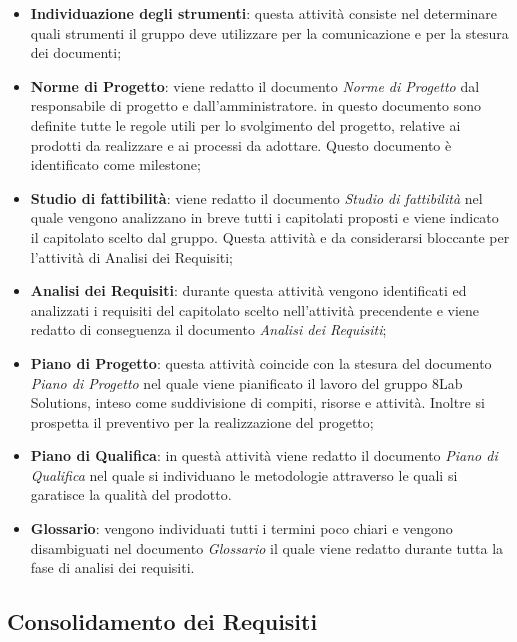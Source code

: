 \begin{itemize}
	\item \textbf{Individuazione degli strumenti}: questa attività consiste nel 
	determinare quali strumenti il gruppo deve utilizzare per la comunicazione 
	e per la stesura dei documenti; 
	\item \textbf{Norme di Progetto}: viene redatto il documento \textit{Norme 
	di Progetto} dal responsabile di progetto e dall'amministratore. in questo 
	documento sono definite tutte le regole utili per lo svolgimento del 
	progetto, relative ai prodotti da realizzare e ai processi da adottare. 
	Questo documento è identificato come milestone\glo; %
	\item \textbf{Studio di fattibilità}: viene redatto il documento 
	\textit{Studio di fattibilità} nel quale vengono analizzano in breve tutti 
	i capitolati proposti e viene indicato il capitolato scelto dal gruppo. 
	Questa attività e da considerarsi bloccante per l'attività di Analisi dei 
	Requisiti;
	\item \textbf{Analisi dei Requisiti}: durante questa attività vengono 
	identificati ed analizzati i requisiti del capitolato scelto nell'attività 
	precendente e viene redatto di conseguenza il documento \textit{Analisi dei 
	Requisiti};
	\item \textbf{Piano di Progetto}: questa attività coincide con la stesura 
	del documento \textit{Piano di Progetto} nel quale viene pianificato il 
	lavoro del gruppo 8Lab Solutions, inteso come suddivisione di compiti, 
	risorse e attività. Inoltre si prospetta il preventivo per la realizzazione 
	del progetto;
	\item \textbf{Piano di Qualifica}: in questà attività viene redatto il 
	documento \textit{Piano di Qualifica} nel quale si individuano le 
	metodologie attraverso le quali si garatisce la qualità del prodotto.
	\item \textbf{Glossario}: vengono individuati tutti i termini poco chiari e 
	vengono disambiguati nel documento \textit{Glossario} il quale viene 
	redatto durante tutta la fase di analisi dei requisiti.
\end{itemize}

\subsection{Consolidamento dei Requisiti}